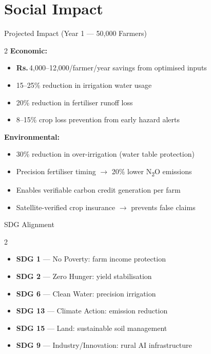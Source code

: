 \documentclass[12pt,a4paper]{article}
\newcommand{\Rup}{\textbf{Rs.\,}}
\begin{document}
\section{Social Impact}

\begin{kpibox}{Projected Impact (Year 1 --- 50,000 Farmers)}
\begin{multicols}{2}
\textbf{Economic:}
\begin{itemize}[leftmargin=*,noitemsep]
  \item \Rup 4,000--12,000/farmer/year savings from optimised inputs
  \item 15--25\% reduction in irrigation water usage
  \item 20\% reduction in fertiliser runoff loss
  \item 8--15\% crop loss prevention from early hazard alerts
\end{itemize}

\columnbreak

\textbf{Environmental:}
\begin{itemize}[leftmargin=*,noitemsep]
  \item 30\% reduction in over-irrigation (water table protection)
  \item Precision fertiliser timing $\rightarrow$ 20\% lower N\textsubscript{2}O emissions
  \item Enables verifiable carbon credit generation per farm
  \item Satellite-verified crop insurance $\rightarrow$ prevents false claims
\end{itemize}
\end{multicols}
\end{kpibox}

\begin{kpibox}{SDG Alignment}
\begin{multicols}{2}
\begin{itemize}[leftmargin=*,noitemsep]
  \item \textbf{SDG 1} --- No Poverty: farm income protection
  \item \textbf{SDG 2} --- Zero Hunger: yield stabilisation
  \item \textbf{SDG 6} --- Clean Water: precision irrigation
  \item \textbf{SDG 13} --- Climate Action: emission reduction
  \item \textbf{SDG 15} --- Land: sustainable soil management
  \item \textbf{SDG 9} --- Industry/Innovation: rural AI infrastructure
\end{itemize}
\end{multicols}
\end{kpibox}
\end{document}
